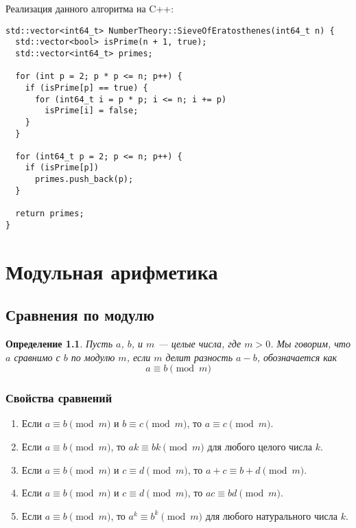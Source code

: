 \documentclass[12pt, a4paper, openany]{book}
\newtheorem*{definition}{Определение}
\begin{document}
\newpage
\noindent
Реализация данного алгоритма на C++:

\begin{lstlisting}[breaklines=true]
std::vector<int64_t> NumberTheory::SieveOfEratosthenes(int64_t n) {
  std::vector<bool> isPrime(n + 1, true);
  std::vector<int64_t> primes;

  for (int p = 2; p * p <= n; p++) {
    if (isPrime[p] == true) {
      for (int64_t i = p * p; i <= n; i += p)
        isPrime[i] = false;
    }
  }

  for (int64_t p = 2; p <= n; p++) {
    if (isPrime[p])
      primes.push_back(p);
  }

  return primes;
}
\end{lstlisting}

\chapter[Модульная арифметика]{Модульная арифметика}
\section{Сравнения по модулю}

\begin{definition}
Пусть $a$, $b$, и $m$ --- целые числа, где $m > 0$. Мы говорим, что $a$ сравнимо с $b$ по модулю $m$, если $m$ делит разность $a - b$, обозначается как \[a \equiv b \pmod{m}\]
\end{definition}

\subsection{Свойства сравнений}

\begin{enumerate}
    \item Если $a \equiv b \pmod{m}$ и $b \equiv c \pmod{m}$, то $a \equiv c \pmod{m}$.
    \item Если $a \equiv b \pmod{m}$, то $ak \equiv bk \pmod{m}$ для любого целого числа $k$.
    \item Если $a \equiv b \pmod{m}$ и $c \equiv d \pmod{m}$, то $a + c \equiv b + d \pmod{m}$.
    \item Если $a \equiv b \pmod{m}$ и $c \equiv d \pmod{m}$, то $ac \equiv bd \pmod{m}$.
    \item Если $a \equiv b \pmod{m}$, то $a^k \equiv b^k \pmod{m}$ для любого натурального числа $k$.
\end{enumerate}
\end{document}

